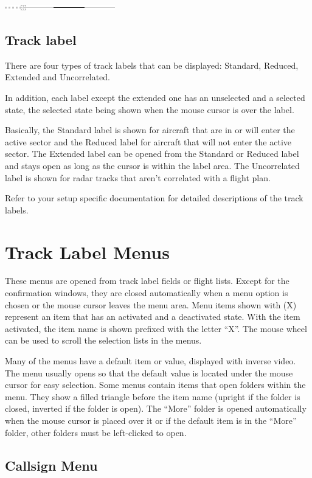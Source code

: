 \documentclass[11pt,a4paper]{memoir}
\begin{document}
\includegraphics{img/rps_predline+history_selected.png}

\subsection{Track label}
There are four types of track labels that can be displayed: Standard, Reduced, Extended and Uncorrelated.

In addition, each label except the extended one has an unselected and a selected state, the selected state being shown when the mouse cursor is over the label.

Basically, the Standard label is shown for aircraft that are in or will enter the active sector and the Reduced label for aircraft that will not enter the active sector. The Extended label can be opened from the Standard or Reduced label and stays open as long as the cursor is within the label area. The Uncorrelated label is shown for radar tracks that aren’t correlated with a flight plan.

Refer to your setup specific documentation for detailed descriptions of the track labels.

\section{Track Label Menus}

These menus are opened from track label fields or flight lists. Except for the confirmation windows, they are closed automatically when a menu option is chosen or the mouse cursor leaves the menu area. Menu items shown with (X) represent an item that has an activated and a deactivated state. With the item activated, the item name is shown prefixed with the letter “X”. The mouse wheel can be used to scroll the selection lists in the menus.

Many of the menus have a default item or value, displayed with inverse video. The menu usually opens so that the default value is located under the mouse cursor for easy selection. Some menus contain items that open folders within the menu. They show a filled triangle before the item name (upright if the folder is closed, inverted if the folder is open). The “More” folder is opened automatically when the mouse cursor is placed over it or if the default item is in the “More” folder, other folders must be left-clicked to open.

\subsection{Callsign Menu}
\label{menu:cs}
\end{document}
